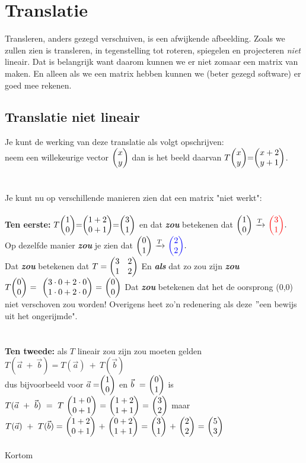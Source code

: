 \section{Translatie}		
Transleren, anders gezegd verschuiven, is een afwijkende afbeelding. Zoals we zullen zien is transleren, in tegenstelling tot roteren, spiegelen en projecteren \textit{niet} lineair. Dat is belangrijk want daarom kunnen we er niet zomaar een matrix van maken. En alleen als we een matrix hebben kunnen we (beter gezegd software) er  goed mee rekenen. 
\subsection{Translatie niet lineair}
Je kunt de werking van deze translatie als volgt opschrijven:\\ neem een willekeurige vector $ \vectwee{x}{y} $ dan is het beeld daarvan $ T \vectwee{x}{y} = \vectwee{x+2}{y+1} $.\\ \\ \\
Je kunt nu op verschillende manieren zien dat een matrix "niet werkt":\\ \\
\textbf{ Ten eerste:} $ T \vectwee{1}{0} = \vectwee{1+2}{0+1} = \vectwee{3}{1} $ en dat \textit{\textbf{zou}} betekenen dat 
$ \vectwee{1}{0}  \  \xrightarrow{T}   \   \vectwee[red]{ 3 } {1}. $ \\ Op dezelfde manier \textit{\textbf{zou}} je zien dat  
$ \vectwee{0}{1}  \  \xrightarrow{T}   \   \vectwee[blue]{ 2 } {2}. $ \\ Dat \textbf{\textit{zou}} betekenen dat 
$ T = \begin{pmatrix}  3 & 2  \\  1 & 2  \end{pmatrix} $ En \textbf{\textit{als}} dat zo zou zijn \textbf{\textit{zou}} 
$  T \vectwee{0}{0} \ = \ 
\ \vectwee{ 3\cdot 0 + 2\cdot 0 }{ 1\cdot 0 + 2\cdot 0 } \ 
= \ \vectwee{0}{0} $ Dat \textbf{\textit{zou}} betekenen dat het de oorsprong (0,0) niet verschoven zou worden! Overigens heet zo'n redenering als deze  $"$een bewijs uit het ongerijmde".\\ \\ \\
\textbf{Ten tweede:} als $T$ lineair zou zijn zou moeten gelden\\ 
$ T(\vec{a} \ + \ \vec{b} )  
=  T(\vec{a}) \ + \ T(\vec{b}) $ \\ dus bijvoorbeeld voor $ \vec{a} = \vectwee{1}{0} $ en   
$ \vec{b} \ = \ \vectwee{0}{1} $  is \\ 
$ T(\vec{a} \ + \ \vec{b} ) \ 
= \ T \ \vectwee{1+0}{0+1} \ 
= \  \vectwee{1+2}{1+1} \ 
= \ \vectwee{3}{2}  $ 
\quad maar \\
$ T(\vec{a}) \ + \ T(\vec{b}) 
= \  \vectwee{1+2}{0+1} \  + \  \vectwee{0+2}{1+1} \ 
= \  \vectwee{3}{1} \ + \  \vectwee{2}{2} \ 
= \  \vectwee{5}{3} \ 
$\\ \\
Kortom 

